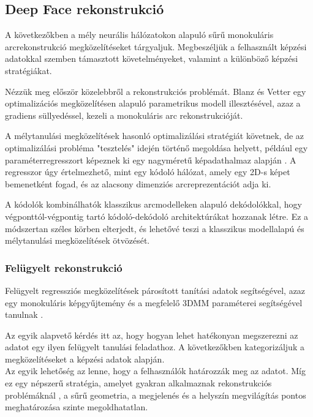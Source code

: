 \documentclass[12pt,a4]{article}
\begin{document}
	\subsection{Deep Face rekonstrukció}
	
	 A következőkben a mély neurális hálózatokon alapuló sűrű monokuláris arcrekonstrukció megközelítéseket tárgyaljuk. Megbeszéljük
	a felhasznált képzési adatokkal szemben támasztott követelményeket, valamint a különböző képzési
	stratégiákat. 
	
	
	Nézzük meg először közelebbről a rekonstrukciós problémát. Blanz és Vetter \cite{blanzvetter} egy optimalizációs megközelítésen alapuló parametrikus modell illesztésével, azaz a gradiens süllyedéssel, kezeli a monokuláris arc rekonstrukcióját. 
	
	
	 A mélytanulási megközelítések hasonló optimalizálási stratégiát követnek, de az optimalizálási probléma 
	"tesztelés" idején történő megoldása helyett, például egy paraméterregresszort képeznek ki egy nagyméretű képadathalmaz alapján \cite{3dmm}. A regresszor úgy értelmezhető, mint egy kódoló hálózat, amely egy 2D-s képet
	bemenetként fogad, és az alacsony dimenziós arcreprezentációt adja ki. 
	
	
	A
	kódolók kombinálhatók klasszikus arcmodelleken alapuló dekódolókkal,
	hogy végponttól-végpontig tartó kódoló-dekódoló architektúrákat hozzanak létre.
	Ez a módszertan széles körben elterjedt, és lehetővé teszi a klasszikus
	modellalapú és mélytanulási megközelítések ötvözését.
	
	\subsubsection{Felügyelt rekonstrukció}
	Felügyelt regressziós megközelítések
	párosított tanítási adatok segítségével, azaz egy monokuláris  képgyűjtemény
	és a megfelelő 3DMM paraméterei segítségével tanulnak \cite{3dmm}.
	
	
	Az egyik alapvető kérdés itt az, hogy hogyan lehet hatékonyan megszerezni az adatot egy ilyen felügyelt tanulási feladathoz. A következőkben
	kategorizáljuk a megközelítéseket a
	képzési adatok alapján. \\
	
	
	Az egyik lehetőség az lenne, hogy a felhasználók határozzák meg az adatot. Míg ez egy népszerű stratégia, amelyet gyakran alkalmaznak rekonstrukciós problémáknál \cite{saragih}, 
	a sűrű geometria, a megjelenés és a helyszín megvilágítás pontos meghatározása szinte megoldhatatlan.
	
\end{document}
